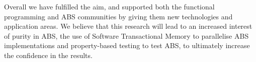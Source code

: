 
Overall we have fulfilled the aim, and supported both the functional programming and ABS communities by giving them new technologies and application areas. We believe that this research will lead to an increased interest of purity in ABS, the use of Software Transactional Memory to parallelise ABS implementations and property-based testing to test ABS, to ultimately increase the confidence in the results.
